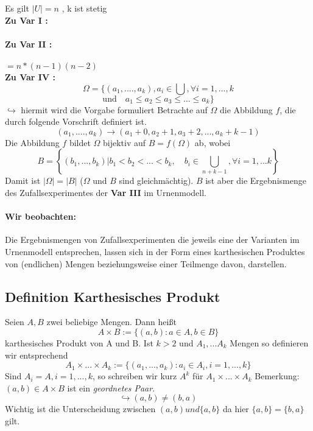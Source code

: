 \documentclass[12pt,a4paper]{article}
\newcommand{\newpara}{\vskip 0.5cm}
\begin{document}
\newpage
	Es gilt $|U| = n$ , k ist stetig\\
	\textbf{Zu Var I :} \\
	 \\
	\textbf{Zu Var II :} \\
	\\
	$=n*(n-1)(n-2)$ \\
	\textbf{Zu Var IV :} \\
	$$\Omega=\{(a_1,....,a_k), a_i\in\bigcup, \forall i=1,...,k$$
	$$\text{und} \quad a_1\leq a_2 \leq a_3 \leq ... \leq a_k\}$$
	$\hookrightarrow$ hiermit wird die Vorgabe  formuliert \newline
	Betrachte auf $\Omega$ die Abbildung $f$, die durch folgende Vorschrift definiert ist.
	$$(a_1,....,a_k)\rightarrow(a_1+0,a_2+1,a_3+2,...,a_k+k-1)$$
	Die Abbildung $f$ bildet $\Omega$ bijektiv auf $B = f(\Omega)$ ab, wobei
	$$B=\left\{(b_1,...,b_k)|b_1<b_2<...<b_k, \quad b_i\in\bigcup_{n+k-1},\forall i=1,...k\right\}$$
	Damit ist $|\Omega| = |B|$ ($\Omega$ und $B$ sind gleichmächtig). $B$ ist aber die Ergebnismenge des 
	Zufallsexperimentes der \textbf{Var III} im Urnenmodell.
	\paragraph{Wir beobachten: }
	Die Ergebnismengen von Zufallsexperimenten die jeweils eine der Varianten im 
	Urnenmodell entsprechen, lassen sich in der Form eines karthesischen Produktes von (endlichen) Mengen beziehungsweise	einer Teilmenge davon, darstellen.
	\subsection{Definition Karthesisches Produkt}
		Seien $A,B$ zwei beliebige Mengen. Dann heißt
		$$A\times B :=\{(a,b):a\in A, b\in B\}$$
		karthesisches Produkt von A und B. Ist $k>2$ und $A_1,...A_k$ Mengen so definieren wir entsprechend
		$$A_1\times ... \times A_k :=\{(a_1,...,a_k):a_i\in A_i,i=1,...,k\}$$
		Sind $A_i=A,i=1,...,k$, so schreiben wir kurz $A^k$ für $A_1\times ... \times A_k$
		Bemerkung: \newline
		$(a,b)\in A\times B$ ist ein \textit{geordnetes Paar}.
		$$\hookrightarrow (a,b) \neq  (b,a)$$
		Wichtig ist die Unterscheidung zwischen $(a,b) und \{a,b\}$ da hier $\{a,b\}=\{b,a\}$ gilt.
\newpara
\end{document}
